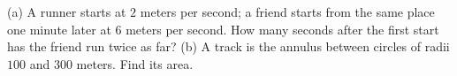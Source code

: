 (a) A runner starts at $2$ meters per second; a friend starts from the same place one minute later at $6$ meters per second. How many seconds after the first start has the friend run twice as far? (b) A track is the annulus between circles of radii $100$ and $300$ meters. Find its area.

